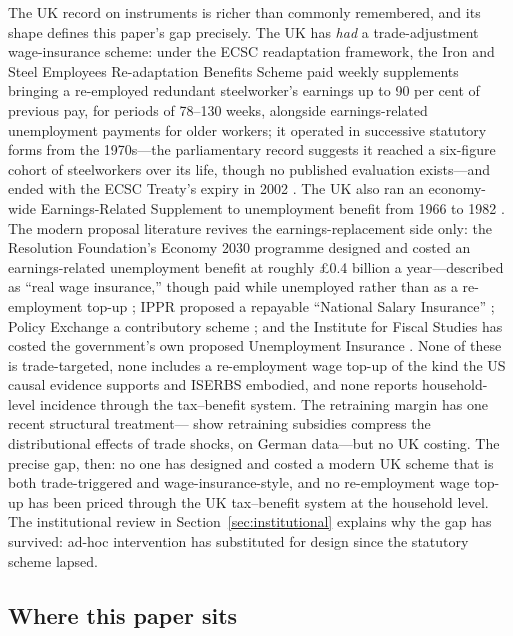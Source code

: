 The UK record on instruments is richer than commonly remembered, and its
shape defines this paper's gap precisely. The UK has \emph{had} a
trade-adjustment wage-insurance scheme: under the ECSC readaptation
framework, the Iron and Steel Employees Re-adaptation Benefits Scheme
paid weekly supplements bringing a re-employed redundant steelworker's
earnings up to 90 per cent of previous pay, for periods of 78--130 weeks,
alongside earnings-related unemployment payments for older workers; it
operated in successive statutory forms from the 1970s---the
parliamentary record suggests it reached a six-figure cohort of
steelworkers over its life, though no published evaluation exists---and
ended with the ECSC Treaty's expiry in 2002 \citep{iserbs1988, iserbsrevocation2012}. The UK
also ran an economy-wide Earnings-Related Supplement to unemployment
benefit from 1966 to 1982 \citep{micklewright1989}. The modern proposal literature revives the
earnings-replacement side only: the Resolution Foundation's Economy 2030
programme designed and costed an earnings-related unemployment benefit
at roughly \pounds 0.4 billion a year---described as ``real wage
insurance,'' though paid while unemployed rather than as a re-employment
top-up \citep{resolutionfoundation2023}; IPPR proposed a repayable
``National Salary Insurance'' \citep{ippr2011}; Policy Exchange a
contributory scheme \citep{policyexchange2022}; and the Institute for
Fiscal Studies has costed the government's own proposed Unemployment
Insurance \citep{ifs2025ui}. None of these is trade-targeted, none
includes a re-employment wage top-up of the kind the US causal evidence
supports and ISERBS embodied, and none reports household-level incidence
through the tax--benefit system. The retraining margin has one recent
structural treatment---\citet{conwell2024} show retraining subsidies
compress the distributional effects of trade shocks, on German data---but
no UK costing. The precise gap, then: no one has designed and costed a
modern UK scheme that is both trade-triggered and wage-insurance-style,
and no re-employment wage top-up has been priced through the UK
tax--benefit system at the household level. The
institutional review in Section~\ref{sec:institutional} explains why the
gap has survived: ad-hoc intervention has substituted for design since
the statutory scheme lapsed.

\subsection{Where this paper sits}

